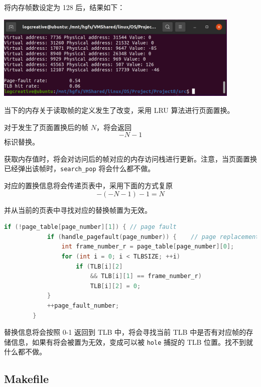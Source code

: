 \documentclass[12pt,a4paper]{article}
\newenvironment{problems}{\begin{list}{}{\renewcommand{\makelabel}[1]{\textbf{##1}\hfil}}}{\end{list}}
\providecommand{\code}[2]{}
\begin{document}
\begin{problems}
    将内存帧数设定为 128 后，结果如下：

    \includegraphics[width=0.88\textwidth]{pagerepl.png}

    当下的内存关于读取帧的定义发生了改变，采用 LRU 算法进行页面置换。
    \code{src/memory.h}{c}
    \code{src/memory.c}{c}

    对于发生了页面置换后的帧 $N$，将会返回
    \begin{equation*}
        -N-1
    \end{equation*}
    标识替换。

    获取内存值时，将会对访问后的帧对应的内存访问栈进行更新。注意，当页面置换已经弹出该帧时，\verb"search_pop" 将会什么都不做。

    \code{src/pagetab.h}{c}
    \code{src/pagetab.c}{c}

    对应的置换信息将会传递页表中，采用下面的方式复原
    \begin{equation*}
        -(-N-1)-1 = N
    \end{equation*}

    并从当前的页表中寻找对应的替换帧置为无效。

    \begin{lstlisting}[language=c]
        if (!page_table[page_number][1]) { // page fault
			if (handle_pagefault(page_number)) {	// page replacement
				int frame_number_r = page_table[page_number][0];
				for (int i = 0; i < TLBSIZE; ++i)
					if (TLB[i][2]
						&& TLB[i][1] == frame_number_r)
						TLB[i][2] = 0;
			}
			++page_fault_number;
		}
    \end{lstlisting}

    替换信息将会按照 0-1 返回到 TLB 中，将会寻找当前 TLB 中是否有对应帧的存储信息，如果有将会被置为无效，变成可以被 \verb"hole" 捕捉的 TLB 位置。找不到就什么都不做。

\end{problems}

\begin{appendices}
    \section{Makefile}
    \code{src/Makefile}{}

\end{appendices}
\end{document}
